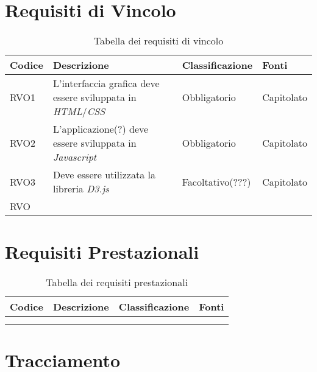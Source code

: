 \section{Requisiti di Vincolo}
\begin{table}[H]
  \centering
  \begin{tabular}{|p{}|p{6cm}|p{3cm}|p{2cm}|}
    \hline
    \rowcolor[HTML]{036400}
    {\color[HTML]{FFFFFF} \textbf{Codice}} & {\color[HTML]{FFFFFF} \textbf{Descrizione}} & {\color[HTML]{FFFFFF} \textbf{Classificazione}} & {\color[HTML]{FFFFFF} \textbf{Fonti}} \\ \hline
    \rowcolor[HTML]{EFEFEF}
    RVO1 & L'interfaccia grafica deve essere sviluppata in \textit{HTML}/\textit{CSS} & Obbligatorio & Capitolato \\ \hline
    \rowcolor[HTML]{C0C0C0}
    RVO2 & L'applicazione(?) deve essere sviluppata in \textit{Javascript} & Obbligatorio & Capitolato \\ \hline
    \rowcolor[HTML]{EFEFEF}
    RVO3 & Deve essere utilizzata la libreria \textit{D3.js} & Facoltativo(???) & Capitolato \\ \hline
    \rowcolor[HTML]{C0C0C0}
    RVO &  &  &  \\ \hline
  \end{tabular}
  \caption{Tabella dei requisiti di vincolo}
\end{table}

\section{Requisiti Prestazionali}
\begin{table}[H]
  \centering
  \begin{tabular}{|p{}|p{6cm}|p{3cm}|p{2cm}|}
    \hline
    \rowcolor[HTML]{036400}
    {\color[HTML]{FFFFFF} \textbf{Codice}} & {\color[HTML]{FFFFFF} \textbf{Descrizione}} & {\color[HTML]{FFFFFF} \textbf{Classificazione}} & {\color[HTML]{FFFFFF} \textbf{Fonti}} \\ \hline
    \rowcolor[HTML]{EFEFEF}
    &  &  &  \\ \hline
    \rowcolor[HTML]{C0C0C0}
    &  &  &  \\ \hline
  \end{tabular}
  \caption{Tabella dei requisiti prestazionali}
\end{table}

\section{Tracciamento}

